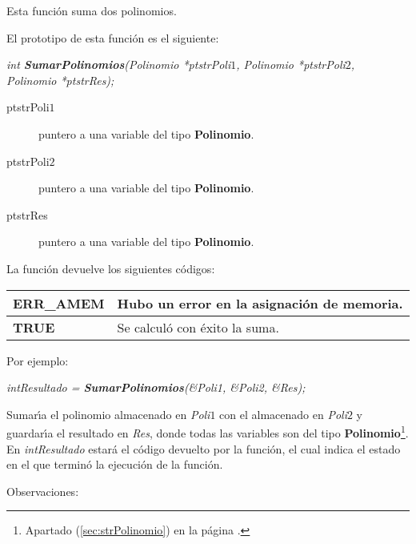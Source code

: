 Esta funci\'on suma dos polinomios.\newline

El prototipo de esta funci\'on es el siguiente:

\begin{center}
\emph{int \textbf{SumarPolinomios}(Polinomio *ptstrPoli$1$,
Polinomio *ptstrPoli$2$, \\Polinomio *ptstrRes);}
\end{center}

\begin{description}
\item[ptstrPoli$1$] puntero a una variable del tipo \textbf{Polinomio}. 
\item[ptstrPoli$2$] puntero a una variable del tipo \textbf{Polinomio}. 
\item[ptstrRes] puntero a una variable del tipo \textbf{Polinomio}.
\end{description}

La funci\'on devuelve los siguientes c\'odigos:

\begin{center}
\begin{tabular}{|l|l|}
\hline
\textbf{ERR\_AMEM} & Hubo un error en la asignaci\'on de memoria. \\
\hline
\textbf{TRUE} & Se calcul\'o con \'exito la suma. \\
\hline
\end{tabular}
\end{center}

Por ejemplo:

\begin{center}
\emph{intResultado = \textbf{SumarPolinomios}(\&Poli1, \&Poli2, \&Res);}
\end{center}

Sumar\'{\i}a el polinomio almacenado en \emph{Poli$1$} con el almacenado
en \emph{Poli$2$} y guardar\'{\i}a el resultado en \emph{Res}, donde todas las
variables son del tipo \textbf{Polinomio}\footnote{Apartado 
(\ref{sec:strPolinomio}) en la p\'agina \pageref{sec:strPolinomio}.}.\\

En \emph{intResultado} estar\'a el c\'odigo devuelto por la funci\'on, el cual
indica el estado en el que termin\'o la ejecuci\'on de la funci\'on.\newline

Observaciones:

